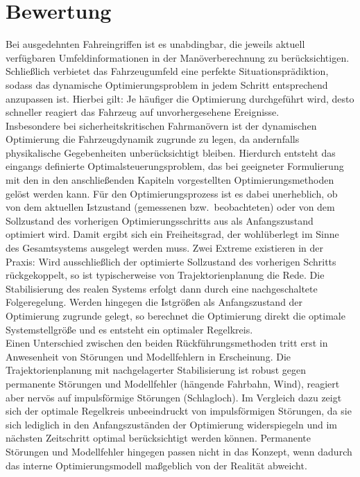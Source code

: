 \section{Bewertung} %
Bei ausgedehnten Fahreingriffen ist es unabdingbar, die jeweils aktuell verfügbaren Umfeldinformationen in der Manöverberechnung zu berücksichtigen. Schließlich verbietet das Fahrzeugumfeld eine perfekte Situationsprädiktion, sodass das dynamische Optimierungsproblem in jedem Schritt entsprechend anzupassen ist. Hierbei gilt: Je häufiger die Optimierung durchgeführt wird, desto schneller reagiert das Fahrzeug auf unvorhergesehene Ereignisse. \\
Insbesondere bei sicherheitskritischen Fahrmanövern ist der dynamischen Optimierung die Fahrzeugdynamik zugrunde zu legen, da andernfalls physikalische Gegebenheiten unberücksichtigt bleiben. Hierdurch entsteht das eingangs definierte Optimalsteuerungsproblem, das bei geeigneter Formulierung mit den in den anschließenden Kapiteln vorgestellten Optimierungsmethoden gelöst werden kann. Für den Optimierungsprozess ist es dabei unerheblich, ob von dem aktuellen Istzustand (gemessenen bzw.\ beobachteten) oder von dem Sollzustand des vorherigen Optimierungsschritts aus als Anfangszustand optimiert wird. Damit ergibt sich ein Freiheitsgrad, der wohlüberlegt im Sinne des Gesamtsystems ausgelegt werden muss. Zwei Extreme existieren in der Praxis: Wird ausschließlich der optimierte Sollzustand des vorherigen Schritts rückgekoppelt, so ist typischerweise von Trajektorienplanung die Rede. Die Stabilisierung des realen Systems erfolgt dann durch eine nachgeschaltete Folgeregelung. Werden hingegen die Istgrößen als Anfangszustand der Optimierung zugrunde gelegt, so berechnet die Optimierung direkt die optimale Systemstellgröße und es entsteht ein optimaler Regelkreis.  \\
Einen Unterschied zwischen den beiden Rückführungsmethoden tritt erst in Anwesenheit von Störungen und Modellfehlern in Erscheinung. Die Trajektorienplanung mit nachgelagerter Stabilisierung ist \iA robust gegen permanente Störungen und Modellfehler (hängende Fahrbahn, Wind), reagiert aber nervös auf impulsförmige Störungen (Schlagloch). Im Vergleich dazu zeigt sich der optimale Regelkreis unbeeindruckt von impulsförmigen Störungen, da sie sich lediglich in den Anfangszuständen der Optimierung widerspiegeln und im nächsten Zeitschritt optimal berücksichtigt werden können. Permanente Störungen und Modellfehler hingegen passen nicht in das Konzept, wenn dadurch das interne Optimierungsmodell maßgeblich von der Realität abweicht. \\
